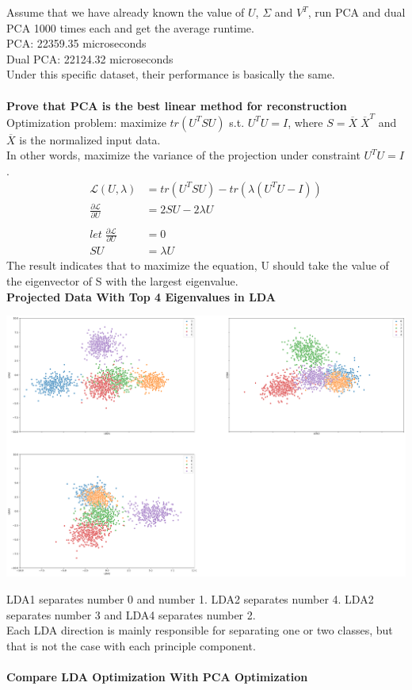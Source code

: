 \documentclass[12pt]{article}
\begin{document}
\noindent
Assume that we have already known the value of $U$, $\Sigma$ and $V^T$, run PCA and dual PCA 1000 times each and get the average runtime.\\
PCA: 22359.35 microseconds\\
Dual PCA: 22124.32 microseconds\\
Under this specific dataset, their performance is basically the same.\\\\
\textbf{Prove that PCA is the best linear method for reconstruction}\\
Optimization problem: maximize $tr(U^TSU)$ s.t. $U^TU=I$, where $S=\overline{X}\;\overline{X}^T$ and $\overline{X}$ is the normalized input data.\\
In other words, maximize the variance of the projection under constraint $U^TU=I$.
\begin{equation}
\begin{split}
\mathcal{L}(U,\lambda) & = tr(U^TSU) - tr(\lambda(U^TU-I)) \\
\frac{\partial \mathcal{L}}{\partial U} & = 2SU-2\lambda U \\\\
let\;\frac{\partial \mathcal{L}}{\partial U} &=0 \\
SU & = \lambda U 
\end{split}
\end{equation}
\noindent
The result indicates that to maximize the equation, U should take the value of the eigenvector of S with the largest eigenvalue.\\
\textbf{Projected Data With Top 4 Eigenvalues in LDA}
\vspace*{-1.0cm}
\begin{center}
    \includegraphics[width=18cm]{Q2_LDATop3.png}
\end{center}
\noindent
LDA1 separates number 0 and number 1. LDA2 separates number 4. LDA2 separates number 3 and LDA4 separates number 2.\\
Each LDA direction is mainly responsible for separating one or two classes, but that is not the case with each principle component.\\\\
\textbf{Compare LDA Optimization With PCA Optimization}
\end{document}
